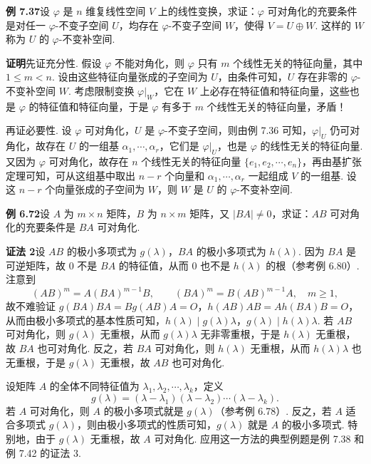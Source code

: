 \documentclass[UTF8,12pt,a4paper,fontset=fandol]{ctexart}
\begin{document}
\noindent\textbf{例 7.37}\quad 设 $\varphi$ 是 $n$ 维复线性空间 $V$ 上的线性变换，求证：$\varphi$ 可对角化的充要条件是对任一 $\varphi$-不变子空间 $U$，均存在 $\varphi$-不变子空间 $W$，使得 $V=U\oplus W$. 这样的 $W$ 称为 $U$ 的 $\varphi$-不变补空间.

\noindent\textbf{证明}\quad 先证充分性. 假设 $\varphi$ 不能对角化，则 $\varphi$ 只有 $m$ 个线性无关的特征向量，其中 $1\le m<n$. 设由这些特征向量张成的子空间为 $U$，由条件可知，$U$ 存在非零的 $\varphi$-不变补空间 $W$. 考虑限制变换 $\varphi|_W$，它在 $W$ 上必存在特征值和特征向量，这些也是 $\varphi$ 的特征值和特征向量，于是 $\varphi$ 有多于 $m$ 个线性无关的特征向量，矛盾！

再证必要性. 设 $\varphi$ 可对角化，$U$ 是 $\varphi$-不变子空间，则由例 7.36 可知，$\varphi|_U$ 仍可对角化，故存在 $U$ 的一组基 $\alpha_1,\cdots,\alpha_r$，它们是 $\varphi|_U$，也是 $\varphi$ 的线性无关的特征向量. 又因为 $\varphi$ 可对角化，故存在 $n$ 个线性无关的特征向量 $\{e_1,e_2,\cdots,e_n\}$，再由基扩张定理可知，可从这组基中取出 $n-r$ 个向量和 $\alpha_1,\cdots,\alpha_r$ 一起组成 $V$ 的一组基. 设这 $n-r$ 个向量张成的子空间为 $W$，则 $W$ 是 $U$ 的 $\varphi$-不变补空间.

\noindent\textbf{例 6.72}\quad 设 $A$ 为 $m\times n$ 矩阵，$B$ 为 $n\times m$ 矩阵，又 $|BA|\ne 0$，求证：$AB$ 可对角化的充要条件是 $BA$ 可对角化.

\noindent\textbf{证法 2}\quad 设 $AB$ 的极小多项式为 $g(\lambda)$，$BA$ 的极小多项式为 $h(\lambda)$. 因为 $BA$ 是可逆矩阵，故 $0$ 不是 $BA$ 的特征值，从而 $0$ 也不是 $h(\lambda)$ 的根（参考例 6.80）. 注意到
\[
(AB)^m=A(BA)^{m-1}B,\qquad (BA)^m=B(AB)^{m-1}A,\quad m\ge 1,
\]
故不难验证 $g(BA)BA=Bg(AB)A=O$，$h(AB)AB=Ah(BA)B=O$，从而由极小多项式的基本性质可知，$h(\lambda)\mid g(\lambda)\lambda$，$g(\lambda)\mid h(\lambda)\lambda$. 若 $AB$ 可对角化，则 $g(\lambda)$ 无重根，从而 $g(\lambda)\lambda$ 无非零重根，于是 $h(\lambda)$ 无重根，故 $BA$ 也可对角化. 反之，若 $BA$ 可对角化，则 $h(\lambda)$ 无重根，从而 $h(\lambda)\lambda$ 也无重根，于是 $g(\lambda)$ 无重根，故 $AB$ 也可对角化.

设矩阵 $A$ 的全体不同特征值为 $\lambda_1,\lambda_2,\cdots,\lambda_k$，定义
\[
g(\lambda)=(\lambda-\lambda_1)(\lambda-\lambda_2)\cdots(\lambda-\lambda_k).
\]
若 $A$ 可对角化，则 $A$ 的极小多项式就是 $g(\lambda)$（参考例 6.78）. 反之，若 $A$ 适合多项式 $g(\lambda)$，则由极小多项式的性质可知，$g(\lambda)$ 就是 $A$ 的极小多项式. 特别地，由于 $g(\lambda)$ 无重根，故 $A$ 可对角化. 应用这一方法的典型例题是例 7.38 和例 7.42 的证法 3.
\end{document}
